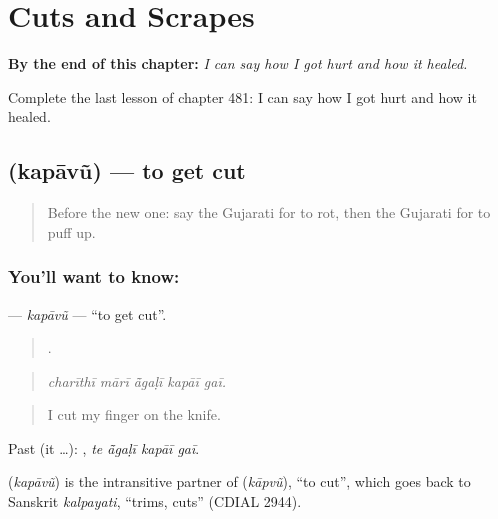 
\chapter{Cuts and Scrapes}
\label{ch:gu-cuts-and-scrapes}

\begin{chapteropening}
\textbf{By the end of this chapter:} \emph{I can say how I got hurt and how it healed.}

Complete the last lesson of chapter 481: I can say how I got hurt and how it healed.
\end{chapteropening}

\section[\texorpdfstring{\gu{કપાવું} (kapāvũ)}{કપાવું (kapāvũ)}]{ (kapāvũ) — to get cut}

\label{lesson:GU-C481-kapavu}



\begin{quote}
Before the new one: say the Gujarati for to rot, then the Gujarati for to puff up.
\end{quote}

\subsection*{You'll want to know: }
\textbf{} — \emph{kapāvũ} — \textquotedblleft{}to get cut\textquotedblright{}.

\begin{quote}
    .
\end{quote}

\begin{quote}
\emph{charīthī mārī ā̃gaḷī kapāī gaī.}
\end{quote}

\begin{quote}
I cut my finger on the knife.
\end{quote}

Past (it …):    , \emph{te ā̃gaḷī kapāī gaī}.

\begin{cousinweb}
\textbf{} (\emph{kapāvũ}) is the intransitive partner of \textbf{} (\emph{kāpvũ}), \textquotedblleft{}to cut\textquotedblright{}, which goes back to Sanskrit \emph{kalpayati}, \textquotedblleft{}trims, cuts\textquotedblright{} (CDIAL 2944).
\end{cousinweb}

